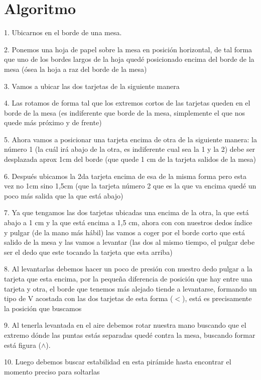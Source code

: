 \documentclass{article}
\begin{document}
\section{Algoritmo} \label{contenido} 
1. Ubicarnos en el borde de una mesa.\par
2. Ponemos una hoja de papel sobre la mesa en posición horizontal, de tal forma que uno de los bordes largos de la hoja quedé posicionado encima del borde de la mesa (ósea la hoja a raz del borde de la mesa)\par
3. Vamos a ubicar las dos tarjetas de la siguiente manera\par
4. Las rotamos de forma tal que los extremos cortos de las tarjetas queden en el borde de la mesa (es indiferente que borde de la mesa, simplemente el que nos quede más próximo y de frente)\par
5. Ahora vamos a posicionar una tarjeta encima de otra de la siguiente manera: la número 1 (la cuál irá abajo de la otra, es indiferente cual sea la 1 y la 2) debe ser desplazada aprox 1cm del borde (que quede 1 cm de la tarjeta salidos de la mesa)\par
6. Después ubicamos la 2da tarjeta encima de esa de la misma forma pero esta vez no 1cm sino 1,5cm (que la tarjeta número 2 que es la que va encima quedé un poco más salida que la que está abajo)\par
7. Ya que tengamos las dos tarjetas ubicadas una encima de la otra, la que está abajo a 1 cm y la que está encima a 1,5 cm, ahora con con nuestros dedos índice y pulgar (de la mano más hábil) las vamos a coger por el borde corto que está salido de la mesa y las vamos a levantar (las dos al mismo tiempo, el pulgar debe ser el dedo que este tocando la tarjeta que esta arriba)\par
8. Al levantarlas debemos hacer un poco de presión con nuestro dedo pulgar a la tarjeta que esta encima, por la pequeña diferencia de posición que hay entre una tarjeta y otra, el borde que tenemos más alejado tiende a levantarse, formando un tipo de V acostada con las dos tarjetas de esta forma ($<$), está es precisamente la posición que buscamos\par
9. Al tenerla levantada en el aire debemos rotar nuestra mano buscando que el extremo dónde las puntas estás separadas quedé contra la mesa, buscando formar está figura ($\wedge$).\par
10. Luego debemos buscar estabilidad en esta pirámide hasta encontrar el momento preciso para soltarlas\par
\end{document}
